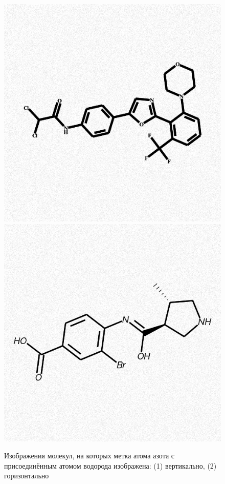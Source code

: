 \begin{figure}[ht!] 
	\center
	\includegraphics [scale=0.45] {my_folder/images/nh_vert}
	\includegraphics [scale=0.45] {my_folder/images/nh_hor}
	\caption{Изображения молекул, на которых метка атома азота с присоединённым атомом водорода изображена: (1) вертикально, (2) горизонтально} 
	\label{fig:nh}  
\end{figure}

